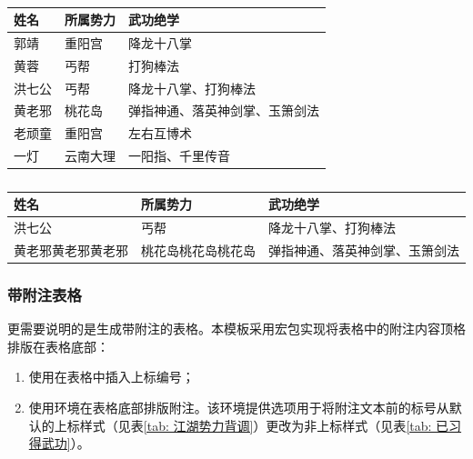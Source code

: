 \documentclass[QingNianC, vlined, timesmathnogreek]{nsfc}
\begin{document}
	\begin{table}[!ht]
		\caption{} \label{tab: 单元格三种水平对齐方式}
		\begin{tabular}{p{2cm} p{3cm}<{\centering} p{7cm}<{\raggedleft}}
			\toprule
			\textbf{姓名} & \textbf{所属势力} & \textbf{武功绝学} \\
			\midrule
			郭靖 & 重阳宫 & 降龙十八掌 \\
			黄蓉 & 丐帮 & 打狗棒法 \\
			洪七公 & 丐帮 & 降龙十八掌、打狗棒法 \\
			黄老邪 & 桃花岛 & 弹指神通、落英神剑掌、玉箫剑法 \\
			老顽童 & 重阳宫 & 左右互博术 \\
			一灯 & 云南大理 & 一阳指、千里传音 \\
			\bottomrule
		\end{tabular}
	\end{table}


	\begin{table}[!ht]
		\caption{} \label{tab: 单元格三种垂直对齐方式}
		\begin{tabular}{p{2cm} b{2cm} m{2cm}}
			\toprule
			\textbf{姓名} & \textbf{所属势力} & \textbf{武功绝学} \\
			\midrule
			洪七公 & 丐帮 & 降龙十八掌、打狗棒法 \\
			黄老邪黄老邪黄老邪 & 桃花岛桃花岛桃花岛 & 弹指神通、落英神剑掌、玉箫剑法 \\
			\bottomrule
		\end{tabular}
	\end{table}
	
	\newpage
	\subsubsection{带附注表格}
	
	更需要说明的是生成带附注的表格。本模板采用宏包实现将表格中的附注内容顶格排版在表格底部：
	\begin{enumerate}
		\item 使用在表格中插入上标编号；
		\setcounter{enumi}{98}%
		\item 使用环境在表格底部排版附注。该环境提供选项用于将附注文本前的标号从默认的上标样式（见表\ref{tab: 江湖势力背调}）更改为非上标样式（见表\ref{tab: 已习得武功}）。
	\end{enumerate}
	
\end{document}
